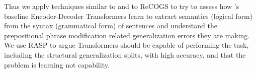 \documentclass[11pt]{article}
\begin{document}
Thus we apply techniques similar to \cite{Zhou2024} and \cite{Weiss2021} to ReCOGS to try to assess how \cite{Wu2023}'s baseline Encoder-Decoder Transformers learn to extract semantics (logical form) from the syntax (grammatical form) of sentences and understand the prepositional phrase modification related generalization errors they are making. We use RASP to argue Transformers should be capable of performing the task, including the structural generalization splits, with high accuracy, and that the problem is learning not capability.

%
%
%
\end{document}
